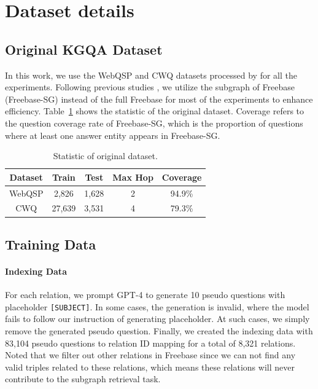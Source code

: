 \documentclass[11pt]{article}
\begin{document}
\section{Dataset details}
\label{app:datasets}
\subsection{Original KGQA Dataset}
In this work, we use the WebQSP and CWQ datasets processed by \citet{luo2024reasoning} for all the experiments. Following previous studies \citep{zhang-etal-2022-subgraph, luo2024reasoning}, we utilize the subgraph of Freebase (Freebase-SG) instead of the full Freebase for most of the experiments to enhance efficiency. Table~\ref{tab:data_statistic_ori} shows the statistic of the original dataset. Coverage refers to the question coverage rate of Freebase-SG, which is the proportion of questions where at least one answer entity appears in Freebase-SG.

\begin{table}[]
    \centering
    \small
    \begin{tabular}{c|cccc}
        \toprule
        \textbf{Dataset} & \textbf{Train} & \textbf{Test} & \textbf{Max Hop} & \textbf{Coverage} \\ \midrule
        WebQSP & 2,826 & 1,628 & 2 & 94.9\% \\
        CWQ & 27,639 & 3,531 & 4 & 79.3\% \\ \bottomrule
    \end{tabular}
    \caption{Statistic of original dataset.}
    \label{tab:data_statistic_ori}
\end{table}


\subsection{Training Data}
\paragraph{Indexing Data}
For each relation, we prompt GPT-4 to generate 10 pseudo questions with placeholder \texttt{[SUBJECT]}. In some cases, the generation is invalid, where the model fails to follow our instruction of generating placeholder. At such cases, we simply remove the generated pseudo question. Finally, we created the indexing data with 83,104 pseudo questions to relation ID mapping for a total of 8,321 relations. Noted that we filter out other relations in Freebase since we can not find any valid triples related to these relations, which means these relations will never contribute to the subgraph retrieval task.
\end{document}
